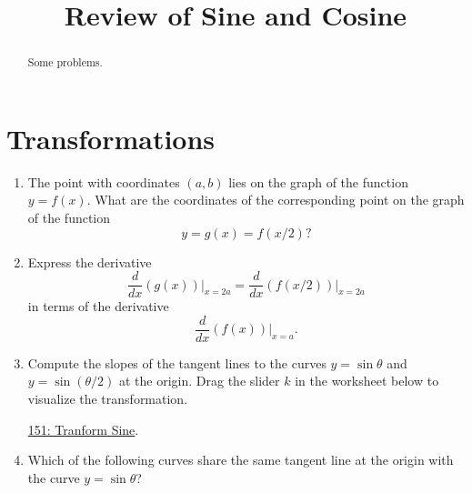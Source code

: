 \documentclass{ximera}
\title{Review of Sine and Cosine}
\begin{document}
\begin{abstract}
Some problems.
\end{abstract}
\maketitle


\section{Transformations}

\begin{question}  \label{QPODFerRE}
\begin{enumerate}

\item The point with coordinates $(a,b)$ lies on the graph of the function $y=f(x)$. What are the coordinates of the corresponding point on the graph of the function 
\[
  y = g(x) = f(x/2)?
\]

\item Express the derivative
\[
    \frac{d}{dx}\left( g(x) \right)\Big|_{x=2a} =  \frac{d}{dx}\left( f(x/2) \right)\Big|_{x=2a}
\]
in terms of the derivative
\[
       \frac{d}{dx}\left(  f(x) \right)\Big|_{x=a} .
\]

\item Compute the slopes of the tangent lines to the curves $y=\sin\theta$ and $y=\sin(\theta/2)$ at the origin. Drag the slider $k$ in the worksheet below to visualize the transformation.

\href{https://www.desmos.com/calculator/2ws2wqg5hv}{151: Tranform Sine}.

 
\begin{onlineOnly}
    \begin{center}
\end{center}
\end{onlineOnly}


\item Which of the following curves share the same tangent line at the origin with the curve $y=\sin\theta$?

\begin{selectAll}
\end{selectAll}


\end{enumerate}
\end{question}
\end{document}
